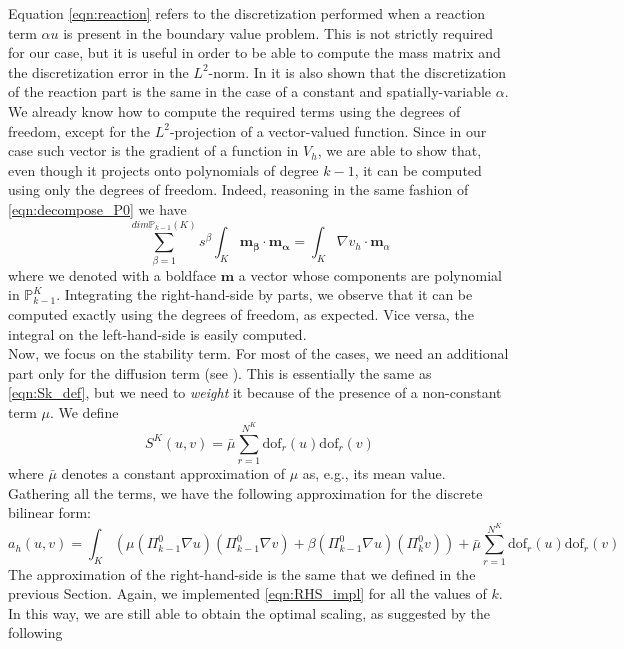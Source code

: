 \documentclass[10pt]{article}
\newcommand{\dof}{\text{dof}}
\begin{document}
Equation \eqref{eqn:reaction} refers to the discretization performed when a reaction term $\alpha u$ is present in the boundary value problem. This is not strictly required for our case, but it is useful in order to be able to compute the mass matrix and the discretization error in the $L^2$-norm. In \cite{hitchhiker} it is also shown that the discretization of the reaction part is the same in the case of a constant and spatially-variable $\alpha$. \\
We already know how to compute the required terms using the degrees of freedom, except for the $L^2$-projection of a vector-valued function. Since in our case such vector is the gradient of a function in $V_h$, we are able to show that, even though it projects onto polynomials of degree $k-1$, it can be computed using only the degrees of freedom. Indeed, reasoning in the same fashion of \eqref{eqn:decompose_P0} we have
$$\sum_{\beta=1}^{dim \mathbb{P}_{k-1}(K)} s^\beta \int_{K} \mathbf{m_\beta} \cdot \mathbf{m_\alpha} = \int_K \nabla v_h \cdot \mathbf{m}_\alpha
\label{eqn:decompose_P0vec}$$
where we denoted with a boldface $\mathbf{m}$ a vector whose components are polynomial in $\mathbb{P}_{k-1}^{K}$. Integrating the right-hand-side by parts, we observe that it can be computed exactly using the degrees of freedom, as expected. Vice versa, the integral on the left-hand-side is easily computed. \\
Now, we focus on the stability term. For most of the cases, we need an additional part only for the diffusion term (see \cite{General}). This is essentially the same as \eqref{eqn:Sk_def}, but we need to \textit{weight} it because of the presence of a non-constant term $\mu$. We define
\begin{equation}
S^K(u,v)=\bar{\mu} \sum_{r=1}^{N^K} \dof_r(u) \dof_r(v)
\label{eqn:Sk_weighted_def}
\end{equation}
where $\bar{\mu}$ denotes a constant approximation of $\mu$ as, e.g., its mean value. \\
Gathering all the terms, we have the following approximation for the discrete bilinear form:
$$a_h(u,v)=\int_K \left( \mu (\Pi^0_{k-1} \nabla u) (\Pi^0_{k-1} \nabla v) + \beta (\Pi^0_{k-1} \nabla u) (\Pi^0_{k} v) \right) + \bar{\mu} \sum_{r=1}^{N^K} \dof_r(u) \dof_r(v)$$
The approximation of the right-hand-side is the same that we defined in the previous Section. Again, we implemented \eqref{eqn:RHS_impl} for all the values of $k$. \\
In this way, we are still able to obtain the optimal scaling, as suggested by the following \\
\end{document}
